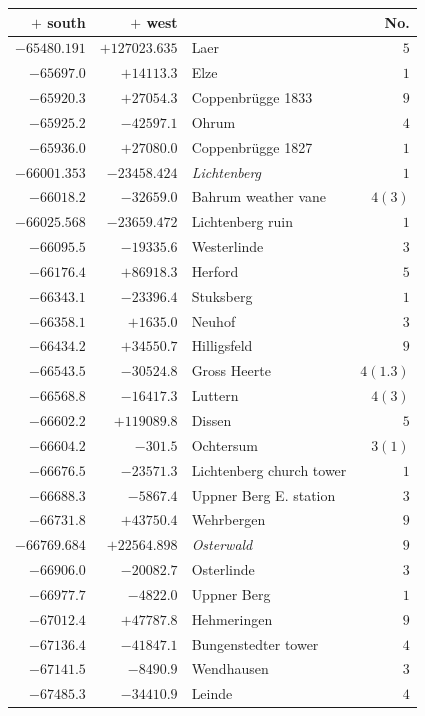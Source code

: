 \clearpage
\begin{center}\begingroup\fontsize{8}{9}\selectfont
\setlength{\tabcolsep}{4pt}
\begin{tabular}{r|r|p{170pt}|r}\hline
\(+\) south&\(+\) west&&No.\\\hline
\(-65480.191\)&\(+127023.635\)&Laer&\(5\)\\
\(-65697.0\)&\(+14113.3\)&Elze&\(1\)\\
\(-65920.3\)&\(+27054.3\)&Coppenbrügge 1833&\(9\)\\
\(-65925.2\)&\(-42597.1\)&Ohrum&\(4\)\\
\(-65936.0\)&\(+27080.0\)&Coppenbrügge 1827&\(1\)\\
\(-66001.353\)&\(-23458.424\)&\textit{Lichtenberg}&\(1\)\\
\(-66018.2\)&\(-32659.0\)&Bahrum weather vane&\(4 (3)\)\\
\(-66025.568\)&\(-23659.472\)&Lichtenberg ruin&\(1\)\\
\(-66095.5\)&\(-19335.6\)&Westerlinde&\(3\)\\
\(-66176.4\)&\(+86918.3\)&Herford&\(5\)\\
\(-66343.1\)&\(-23396.4\)&Stuksberg&\(1\)\\
\(-66358.1\)&\(+1635.0\)&Neuhof&\(3\)\\
\(-66434.2\)&\(+34550.7\)&Hilligsfeld&\(9\)\\
\(-66543.5\)&\(-30524.8\)&Gross Heerte&\(4(1.3)\)\\
\(-66568.8\)&\(-16417.3\)&Luttern&\(4 (3)\)\\
\(-66602.2\)&\(+119089.8\)&Dissen&\(5\)\\
\(-66604.2\)&\(-301.5\)&Ochtersum&\(3 (1)\)\\
\(-66676.5\)&\(-23571.3\)&Lichtenberg church tower&\(1\)\\
\(-66688.3\)&\(-5867.4\)&Uppner Berg E. station&\(3\)\\
\(-66731.8\)&\(+43750.4\)&Wehrbergen&\(9\)\\
\(-66769.684\)&\(+22564.898\)&\textit{Osterwald}&\(9\)\\
\(-66906.0\)&\(-20082.7\)&Osterlinde&\(3\)\\
\(-66977.7\)&\(-4822.0\)&Uppner Berg&\(1\)\\
\(-67012.4\)&\(+47787.8\)&Hehmeringen&\(9\)\\
\(-67136.4\)&\(-41847.1\)&Bungenstedter tower&\(4\)\\
\(-67141.5\)&\(-8490.9\)&Wendhausen&\(3\)\\
\(-67485.3\)&\(-34410.9\)&Leinde&\(4\)\\

\end{tabular}
\end{center}
